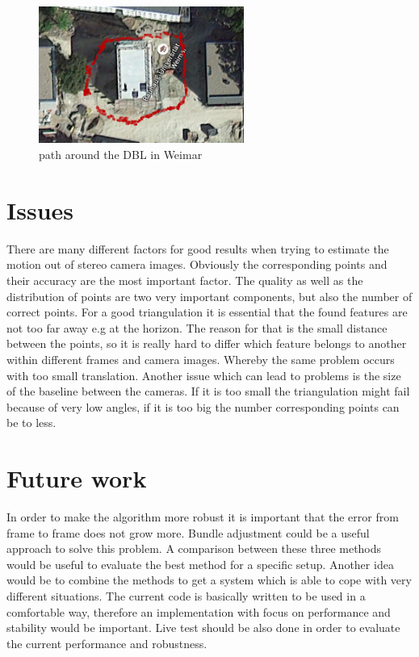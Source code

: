 \documentclass[11pt]{article}
\begin{document}
	\begin{figure}[H]
		\centering
		\includegraphics[width=0.6\textwidth]{images/result.jpg}
		\caption{path around the DBL in Weimar}
	\end{figure}

	\section{Issues}

	There are many different factors for good results when trying to estimate the motion out of stereo camera images. Obviously the corresponding points and their accuracy are the most important factor. The quality as well as the distribution of points are two very important components, but also the number of correct points. For a good triangulation it is essential that the found features are not too far away e.g at the horizon. The reason for that is the small distance between the points, so it is really hard to differ which feature belongs to another within different frames and camera images. Whereby the same problem occurs with too small translation. Another issue which can lead to problems is the size of the baseline between the cameras. If it is too small the triangulation might fail because of very low angles, if it is too big the number corresponding points can be to less.
	
	
	\section{Future work}
	In order to make the algorithm more robust it is important that the error from frame to frame does not grow more. Bundle adjustment could be a useful approach to solve this problem. A comparison between these three methods would be useful to evaluate the best method for a specific setup. Another idea would be to combine the methods to get a system which is able to cope with very different situations. The current code is basically written to be used in a comfortable way, therefore an implementation with focus on performance and stability would be important. Live test should be also done in order to evaluate the current performance and robustness.
	
	\nocite{*}
%
%
\printbibliography
\end{document}
